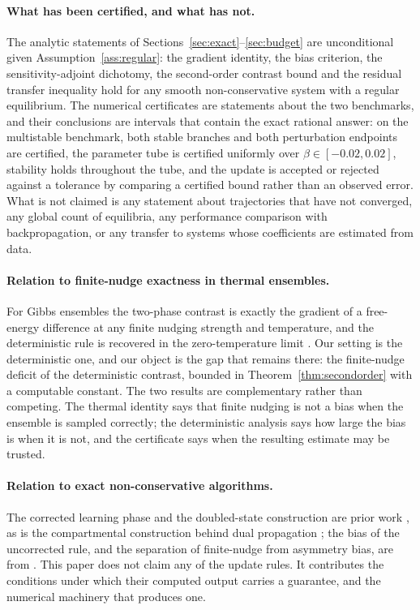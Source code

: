 \documentclass[11pt]{article}
\theoremstyle{definition}
\theoremstyle{remark}
\begin{document}
\paragraph{What has been certified, and what has not.}
The analytic statements of Sections~\ref{sec:exact}--\ref{sec:budget} are unconditional given
Assumption~\ref{ass:regular}: the gradient identity, the bias criterion, the sensitivity-adjoint
dichotomy, the second-order contrast bound and the residual transfer inequality hold for any
smooth non-conservative system with a regular equilibrium. The numerical certificates are
statements about the two benchmarks, and their conclusions are intervals that contain the exact
rational answer: on the multistable benchmark, both stable branches and both perturbation
endpoints are certified, the parameter tube is certified uniformly over
$\beta \in [-0.02,0.02]$, stability holds throughout the tube, and the update is accepted or
rejected against a tolerance by comparing a certified bound rather than an observed error. What is
not claimed is any statement about trajectories that have not converged, any global count of
equilibria, any performance comparison with backpropagation, or any transfer to systems whose
coefficients are estimated from data.

\paragraph{Relation to finite-nudge exactness in thermal ensembles.}
For Gibbs ensembles the two-phase contrast is exactly the gradient of a free-energy difference at
any finite nudging strength and temperature, and the deterministic rule is recovered in the
zero-temperature limit \cite{litman2026}. Our setting is the deterministic one, and our object is
the gap that remains there: the finite-nudge deficit of the deterministic contrast, bounded in
Theorem~\ref{thm:secondorder} with a computable constant. The two results are complementary rather
than competing. The thermal identity says that finite nudging is not a bias when the ensemble is
sampled correctly; the deterministic analysis says how large the bias is when it is not, and the
certificate says when the resulting estimate may be trusted.

\paragraph{Relation to exact non-conservative algorithms.}
The corrected learning phase and the doubled-state construction are prior work
\cite{scurria2026}, as is the compartmental construction behind dual propagation
\cite{hoier2023}; the bias of the uncorrected rule, and the separation of finite-nudge from
asymmetry bias, are from \cite{laborieux2024,scellier2018}. This paper does not claim any of the
update rules. It contributes the conditions under which their computed output carries a guarantee,
and the numerical machinery that produces one.
\end{document}

